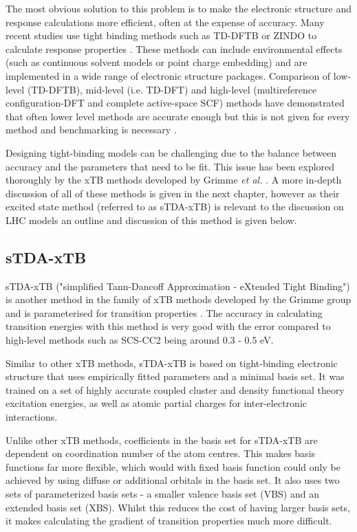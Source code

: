 The most obvious solution to this problem is to make the electronic structure and
response calculations more efficient, often at the expense of accuracy. Many recent
studies use tight binding methods such as TD-DFTB or ZINDO to calculate response
properties \cite{Jurinovich2015, Olbrich2010, Curutchet2011, Curutchet2012}. These
methods can include environmental effects (such as continuous solvent models or 
point charge embedding) and are implemented in a wide range of electronic structure
packages. Comparison of low-level (TD-DFTB), mid-level (i.e. TD-DFT) and high-level
(multireference configuration-DFT and complete active-space SCF) methods have demonstrated
that often lower level methods are accurate enough but this is not given for every
method and benchmarking is necessary \cite{Andreussi2015, Hansen2019, Poddubnyy2021}.

Designing tight-binding models can be challenging due to the balance between accuracy
and the parameters that need to be fit. This issue has been explored thoroughly 
by the xTB methods developed by Grimme \emph{et al.} \cite{Bannwarth2020}. A more
in-depth discussion of all of these methods is given in the next chapter, however
as their excited state method (referred to as sTDA-xTB) is relevant to the discussion
on LHC models an outline and discussion of this method is given below.

\subsection{sTDA-xTB}
\label{subsec:stda_xtb}
sTDA-xTB ("simplified Tann-Dancoff Approximation - eXtended Tight Binding") is another
method in the family of xTB methods developed by the Grimme group and is parameterised
for transition properties \cite{Grimme2016}. The accuracy in calculating transition
energies with this method is very good with the error compared to high-level methods
such as SCS-CC2 being around 0.3 - 0.5 eV.

Similar to other xTB methods, sTDA-xTB is based on tight-binding electronic structure
that uses empirically fitted parameters and a minimal basis set. It was trained 
on a set of highly accurate coupled cluster and density functional theory excitation 
energies, as well as atomic partial charges for inter-electronic interactions.

Unlike other xTB methods, coefficients in the basis set for sTDA-xTB are dependent
on coordination number of the atom centres. This makes basis functions far more 
flexible, which would with fixed basis function could only be achieved by using 
diffuse or additional orbitals in the basis set. It also uses two sets of parameterized 
basis sets - a smaller valence basis set (VBS) and an extended basis set (XBS).
Whilst this reduces the cost of having larger basis sets, it makes calculating the
gradient of transition properties much more difficult.

